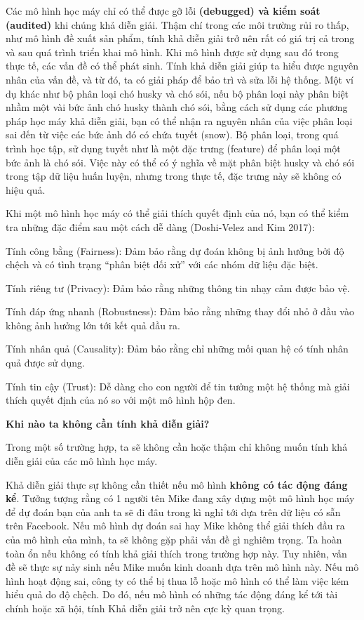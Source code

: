 Các mô hình học máy chỉ có thể được gỡ lỗi \textbf{(debugged) và kiểm soát (audited)} khi chúng khả diễn giải. Thậm chí trong các môi trường rủi ro thấp, như mô hình đề xuất sản phẩm, tính khả diễn giải trở nên rất có giá trị cả trong và sau quá trình triển khai mô hình. Khi mô hình được sử dụng sau đó trong thực tế, các vấn đề có thể phát sinh. Tính khả diễn giải giúp ta hiểu được nguyên nhân của vấn đề, và từ đó, ta có giải pháp để bảo trì và sửa lỗi hệ thống. Một ví dụ khác như bộ phân loại chó husky và chó sói, nếu bộ phân loại này phân biệt nhầm một vài bức ảnh chó husky thành chó sói, bằng cách sử dụng các phương pháp học máy khả diễn giải, bạn có thể nhận ra nguyên nhân của việc phân loại sai đến từ việc các bức ảnh đó có chứa tuyết (snow). Bộ phân loại, trong quá trình học tập, sử dụng tuyết như là một đặc trưng (feature) để phân loại một bức ảnh là chó sói. Việc này có thể có ý nghĩa về mặt phân biệt husky và chó sói trong tập dữ liệu huấn luyện, nhưng trong thực tế, đặc trưng này sẽ không có hiệu quả.

Khi một mô hình học máy có thể giải thích quyết định của nó, bạn có thể kiểm tra những đặc điểm sau một cách dễ dàng (Doshi-Velez and Kim 2017):

\begin{packed_enum}
    \item Tính công bằng (Fairness): Đảm bảo rằng dự đoán không bị ảnh hưởng bởi độ chệch và có tình trạng ``phân biệt đối xử'' với các nhóm dữ liệu đặc biệt.
    \item Tính riêng tư (Privacy): Đảm bảo rằng những thông tin nhạy cảm được bảo vệ.
    \item Tính đáp ứng nhanh (Robustness): Đảm bảo rằng những thay đổi nhỏ ở đầu vào không ảnh hưởng lớn tới kết quả đầu ra.
    \item Tính nhân quả (Causality): Đảm bảo rằng chỉ những mối quan hệ có tính nhân quả được sử dụng.
    \item Tính tin cậy (Trust): Dễ dàng cho con người để tin tưởng một hệ thống mà giải thích quyết định của nó so với một mô hình hộp đen.
\end{packed_enum}
\textbf{Khi nào ta không cần tính khả diễn giải?}

Trong một số trường hợp, ta sẽ không cần hoặc thậm chỉ không muốn tính khả diễn giải của các mô hình học máy.

Khả diễn giải thực sự không cần thiết nếu mô hình \textbf{không có tác động đáng kể}. Tưởng tượng rằng có 1 người tên Mike đang xây dựng một mô hình học máy để dự đoán bạn của anh ta sẽ đi đâu trong kì nghỉ tới dựa trên dữ liệu có sẵn trên Facebook. Nếu mô hình dự đoán sai hay Mike không thể giải thích đầu ra của mô hình của mình, ta sẽ không gặp phải vấn đề gì nghiêm trọng. Ta hoàn toàn ổn nếu không có tính khả giải thích trong trường hợp này. Tuy nhiên, vấn đề sẽ thực sự nảy sinh nếu Mike muốn kinh doanh dựa trên mô hình này. Nếu mô hình hoạt động sai, công ty có thể bị thua lỗ hoặc mô hình có thể làm việc kém hiểu quả do độ chệch. Do đó, nếu mô hình có những tác động đáng kể tới tài chính hoặc xã hội, tính Khả diễn giải trở nên cực kỳ quan trọng.

